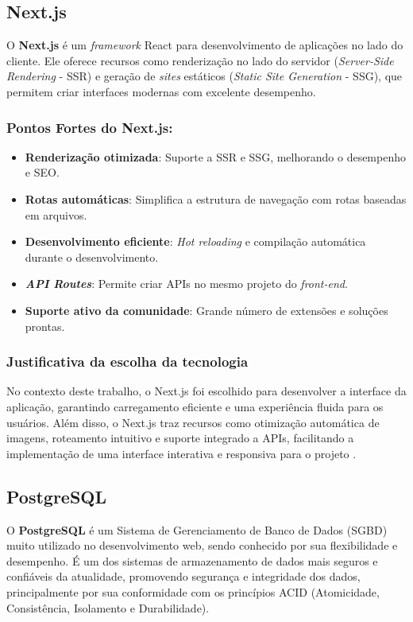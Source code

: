 \subsection{Next.js}

O \textbf{Next.js} é um \textit{framework} React para desenvolvimento de aplicações no lado do cliente. Ele oferece recursos como renderização no lado do servidor (\textit{Server-Side Rendering} - SSR) e geração de \textit{sites} estáticos (\textit{Static Site Generation} - SSG), que permitem criar interfaces modernas com excelente desempenho.

\subsubsection*{Pontos Fortes do Next.js:}
\begin{itemize}
    \item \textbf{Renderização otimizada}: Suporte a SSR e SSG, melhorando o desempenho e SEO.
    \item \textbf{Rotas automáticas}: Simplifica a estrutura de navegação com rotas baseadas em arquivos.
    \item \textbf{Desenvolvimento eficiente}: \textit{Hot reloading} e compilação automática durante o desenvolvimento.
    \item \textbf{\textit{API Routes}}: Permite criar APIs no mesmo projeto do \textit{front-end}.
    \item \textbf{Suporte ativo da comunidade}: Grande número de extensões e soluções prontas.
\end{itemize}

\subsubsection{Justificativa da escolha da tecnologia}
No contexto deste trabalho, o Next.js foi escolhido para desenvolver a interface da aplicação, garantindo carregamento eficiente e uma experiência fluida para os usuários. Além disso, o Next.js traz recursos como otimização automática de imagens, roteamento intuitivo e suporte integrado a APIs, facilitando a implementação de uma interface interativa e responsiva para o projeto \cite{nextjs2025}. 

\subsection{PostgreSQL}

O \textbf{PostgreSQL} é um Sistema de Gerenciamento de Banco de Dados (SGBD) muito utilizado no desenvolvimento web, sendo conhecido por sua flexibilidade e desempenho. É um dos sistemas de armazenamento de dados mais seguros e confiáveis da atualidade, promovendo segurança e integridade dos dados, principalmente por sua conformidade com os princípios ACID (Atomicidade, Consistência, Isolamento e Durabilidade). 

